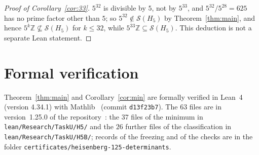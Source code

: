 \documentclass[11pt]{article}
\theoremstyle{definition}
\theoremstyle{remark}
\newcommand{\repoversion}{1.25.0}
\newcommand{\Z}{\mathbb Z}
\newcommand{\cS}{\mathcal S}
\begin{document}
\begin{proof}[Proof of Corollary~\ref{cor:33}]
$5^{32}$ is divisible by $5$, not by $5^{33}$, and $5^{32}/5^{28}=625$ has no
prime factor other than $5$; so $5^{32}\notin\cS(H_5)$ by
Theorem~\ref{thm:main}, and hence $5^k\Z\not\subseteq\cS(H_5)$ for $k\le32$,
while $5^{33}\Z\subseteq\cS(H_5)$. This deduction is not a separate Lean
statement.
\end{proof}

{\sloppy
\section{Formal verification}\label{sec:lean}

Theorem~\ref{thm:main} and Corollary~\ref{cor:min} are formally verified in
Lean~4 (version 4.34.1) with Mathlib~\cite{mathlib} (commit
\texttt{d13f23b7}). The $63$ files are in version~\repoversion{} of the
repository~\cite{repo}: the $37$ files of the minimum in
\texttt{lean/Research/TaskU/H5/} and the $26$ further files of the
classification in \texttt{lean/Research/TaskU/H5B/}; records of the freezing
and of the checks are in the folder
\texttt{certificates/heisenberg-125-determinants}.

}
\end{document}
